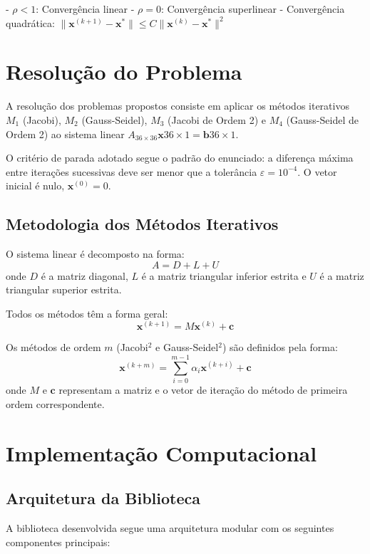 \documentclass[12pt,a4paper]{article}
\begin{document}
- $\rho < 1$: Convergência linear
- $\rho = 0$: Convergência superlinear
- Convergência quadrática: $\|\mathbf{x}^{(k+1)} - \mathbf{x}^*\| \leq C\|\mathbf{x}^{(k)} - \mathbf{x}^*\|^2$


\newpage

\section{Resolução do Problema}

A resolução dos problemas propostos consiste em aplicar os métodos iterativos $M_1$ (Jacobi), $M_2$ (Gauss-Seidel), $M_3$ (Jacobi de Ordem 2) e $M_4$ (Gauss-Seidel de Ordem 2) ao sistema linear $A_{36\times36}\mathbf{x}{36\times1} = \mathbf{b}{36\times1}$.

O critério de parada adotado segue o padrão do enunciado: a diferença máxima entre iterações sucessivas deve ser menor que a tolerância $\varepsilon = 10^{-4}$. O vetor inicial é nulo, $\mathbf{x}^{(0)} = 0$.

\subsection{Metodologia dos Métodos Iterativos}

O sistema linear é decomposto na forma:
\[
A = D + L + U
\]
onde $D$ é a matriz diagonal, $L$ é a matriz triangular inferior estrita e $U$ é a matriz triangular superior estrita.

Todos os métodos têm a forma geral:
\[
\mathbf{x}^{(k+1)} = M\mathbf{x}^{(k)} + \mathbf{c}
\]

Os métodos de ordem $m$ (Jacobi$^2$ e Gauss-Seidel$^2$) são definidos pela forma:
\[
\mathbf{x}^{(k+m)} = \sum_{i=0}^{m-1} \alpha_i \mathbf{x}^{(k+i)} + \mathbf{c}
\]
onde $M$ e $\mathbf{c}$ representam a matriz e o vetor de iteração do método de primeira ordem correspondente.

\section{Implementação Computacional}

\subsection{Arquitetura da Biblioteca}

A biblioteca desenvolvida segue uma arquitetura modular com os seguintes componentes principais:
\end{document}
